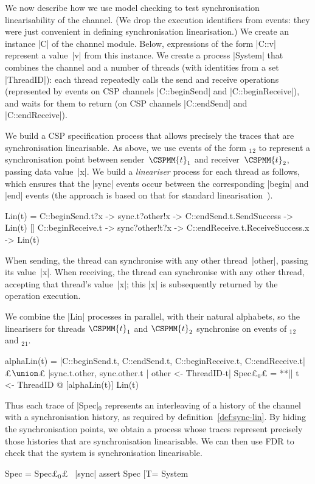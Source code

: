 We now describe how we use model checking to test synchronisation
linearisability of the channel.  (We drop the execution identifiers from
events: they were just convenient in defining synchronisation linearisation.)
We create an instance |C| of the channel module.  Below, expressions of the
form |C::v| represent a value~|v| from this instance.  We create a process
|System| that combines the channel and a number of threads (with identities
from a set |ThreadID|): each thread repeatedly calls the send and receive
operations (represented by events on CSP channels |C::beginSend| and
|C::beginReceive|), and waits for them to return (on CSP channels |C::endSend|
and |C::endReceive|).

We build a CSP specification process that allows precisely the traces that are
synchronisation linearisable.  As above, we use events of the form
$_1$$_2$ to represent a synchronisation point
between sender~$\CSPMM{t}_1$ and receiver~$\CSPMM{t}_2$, passing data
value~|x|.  We build a \emph{lineariser} process for each thread as follows,
which ensures that the |sync| events occur between the corresponding |begin|
and |end| events (the approach is based on that for standard
linearisation~\cite{gavin:lock-free-queue}).
%
\begin{cspm}
Lin(t) = 
  C::beginSend.t?x -> sync.t?other!x -> C::endSend.t.SendSuccess -> Lin(t)
  [] C::beginReceive.t -> sync?other!t?x -> C::endReceive.t.ReceiveSuccess.x -> Lin(t)
\end{cspm}
%
When sending, the thread can synchronise with any other thread~|other|,
passing its value~|x|.  When receiving, the thread can synchronise with any
other thread, accepting that thread's value~|x|; this |x| is subsequently
returned by the operation execution.

We combine the |Lin| processes in parallel, with their natural
alphabets, so the linearisers for threads $\CSPMM{t}_1$ and $\CSPMM{t}_2$
synchronise on events of $_1$$_2$ and
$_2$$_1$.  
%
\begin{cspm}
alphaLin(t) =
  {|C::beginSend.t, C::endSend.t, C::beginReceive.t, C::endReceive.t|} £$\union$£
  {|sync.t.other, sync.other.t | other <- ThreadID-{t}|}
Spec£$_0$£ = **|| t <- ThreadID @ [alphaLin(t)] Lin(t)
\end{cspm} %
%
Thus each trace of |Spec|$_0$ represents an interleaving of a history of the
channel with a synchronisation history, as required by
definition~\ref{def:sync-lin}.  By hiding the synchronisation points, we
obtain a process whose traces represent precisely those histories that are
synchronisation linearisable.  We can then use FDR to check that the system is
synchronisation linearisable.
%
\begin{cspm}
Spec = Spec£$_0$£ \ {|sync|}
assert Spec [T= System
\end{cspm}

